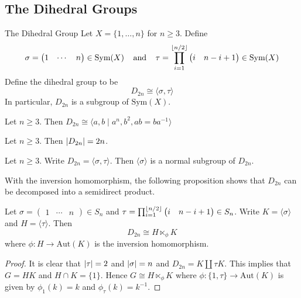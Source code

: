 \documentclass[a4paper]{article}
\begin{document}
\subsection{The Dihedral Groups}
\begin{defn}{The Dihedral Group}{} Let $X=\{1,\dots,n\}$ for $n\geq 3$. Define $$\sigma=\begin{pmatrix}1 & \cdots &  n\end{pmatrix}\in\text{Sym}(X)\text{\;\;\;\;and\;\;\;\;}\tau=\prod_{i=1}^{\lfloor n/2\rfloor}\begin{pmatrix}i & n-i+1\end{pmatrix}\in\text{Sym}(X)$$ Define the dihedral group to be $$D_{2n}\cong\langle\sigma,\tau\rangle$$ In particular, $D_{2n}$ is a subgroup of $\text{Sym}(X)$. 
\end{defn}

\begin{prp}{}{} Let $n\geq 3$. Then $D_{2n}\cong\langle a,b\;|\;a^n, b^2, ab=ba^{-1}\rangle$
\end{prp}

\begin{prp}{}{} Let $n\geq 3$. Then $\abs{D_{2n}}=2n$. 
\end{prp}

\begin{prp}{}{} Let $n\geq 3$. Write $D_{2n}=\langle\sigma,\tau\rangle$. Then $\langle\sigma\rangle$ is a normal subgroup of $D_{2n}$. 
\end{prp}

With the inversion homomorphism, the following proposition shows that $D_{2n}$ can be decomposed into a semidirect product. 

\begin{prp}{}{} Let $\sigma=\begin{pmatrix}1 & \cdots &  n\end{pmatrix}\in S_n$ and $\tau=\prod_{i=1}^{\lfloor n/2\rfloor}\begin{pmatrix}i & n-i+1\end{pmatrix}\in S_n$. Write $K=\langle\sigma\rangle$ and $H=\langle\tau\rangle$. Then $$D_{2n}\cong H\ltimes_\phi K$$ where $\phi:H\to\text{Aut}(K)$ is the inversion homomorphism. \tcbline
\begin{proof}
It is clear that $\abs{\tau}=2$ and $\abs{\sigma}=n$ and $D_{2n}=K\amalg\tau K$. This implies that $G=HK$ and $H\cap K=\{1\}$. Hence $G\cong H\ltimes_\phi K$ where $\phi:\{1,\tau\}\to\text{Aut}(K)$ is given by $\phi_1(k)=k$ and $\phi_{\tau}(k)=k^{-1}$. 
\end{proof}
\end{prp}
\end{document}
